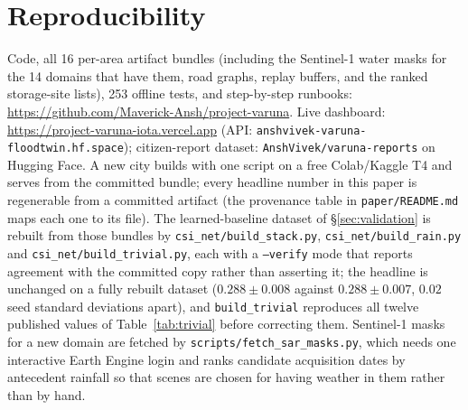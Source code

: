 \documentclass[10pt]{article}
\begin{document}
\section*{Reproducibility}
Code, all 16 per-area artifact bundles (including the Sentinel-1 water masks for the 14
domains that have them, road graphs, replay buffers, and the ranked storage-site lists),
253 offline tests, and step-by-step runbooks:
\url{https://github.com/Maverick-Ansh/project-varuna}. Live dashboard:
\url{https://project-varuna-iota.vercel.app} (API: \texttt{anshvivek-varuna-floodtwin.hf.space});
citizen-report dataset: \texttt{AnshVivek/varuna-reports} on Hugging Face. A new city builds with
one script on a free Colab/Kaggle T4 and serves from the committed bundle; every headline number
in this paper is regenerable from a committed artifact (the provenance table in
\texttt{paper/README.md} maps each one to its file). The learned-baseline dataset of
\S\ref{sec:validation} is rebuilt from those bundles by \texttt{csi\_net/build\_stack.py},
\texttt{csi\_net/build\_rain.py} and \texttt{csi\_net/build\_trivial.py}, each with a
\texttt{--verify} mode that reports agreement with the committed copy rather than asserting
it; the headline is unchanged on a fully rebuilt dataset ($0.288\pm0.008$ against
$0.288\pm0.007$, $0.02$ seed standard deviations apart), and \texttt{build\_trivial} reproduces
all twelve published values of Table~\ref{tab:trivial} before correcting them. Sentinel-1 masks
for a new domain are fetched by \texttt{scripts/fetch\_sar\_masks.py}, which needs one
interactive Earth Engine login and ranks candidate acquisition dates by antecedent rainfall so
that scenes are chosen for having weather in them rather than by hand.



\end{document}
